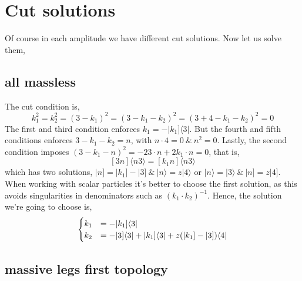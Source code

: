\section{Cut solutions}

Of course in each amplitude we have different cut solutions. Now let us solve them,

\subsection{all massless}

The cut condition is,
\[k_1^2=k_2^2=(3-k_1)^2=(3-k_1-k_2)^2=(3+4-k_1-k_2)^2=0\]
The first and third condition enforces $k_1=-| k_1]\langle 3|$. But the fourth and fifth conditions 
enforces $3-k_1-k_2=n$, with $n\cdot 4=0\ \&\ n^2=0$. Lastly, the second condition imposes $(3-k_1-n)^2=-23\cdot n+2k_1\cdot n=0$, that is, \[[3n]\langle n3\rangle=[k_1n]\langle n3\rangle\] which has two solutions, $|n]=|k_1]-|3]\ \&\ |n\rangle=z|4\rangle$ or $|n\rangle=|3\rangle\ \&\ |n]=z|4]$. 
When working with scalar particles it's better to choose the first solution, as this avoids singularities in denominators such as $(k_1\cdot k_2)^{-1}$. Hence, the solution we're going to choose is,
\begin{align*}
    \begin{cases}
        k_1&=-|k_1]\langle 3|\\
        k_2&=-|3]\langle 3|+|k_1]\langle 3|+z\qty(|k_1]-|3])\langle 4|
    \end{cases}
\end{align*}

\subsection{massive legs first topology}

